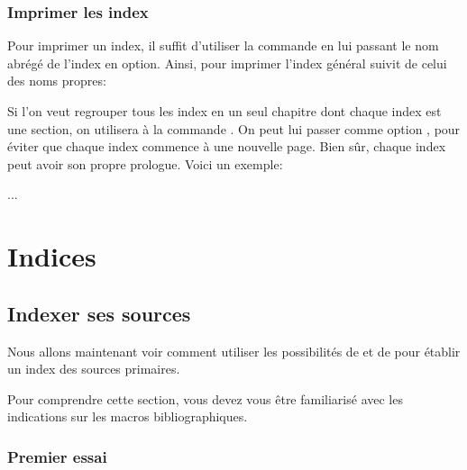 \subsection{Imprimer les index}

Pour imprimer un index, il suffit d'utiliser la commande  en lui passant le nom abrégé de l'index en option. Ainsi, pour imprimer l'index général suivit de celui des noms propres:

\begin{latexcode}
\printindex
\printindex[npr]
\end{latexcode}


\begin{plusloins}

Si l'on veut regrouper tous les index en un seul chapitre dont chaque index est une section, on utilisera  à la commande . On peut lui passer comme option , pour  éviter que chaque index commence à une nouvelle page. Bien sûr, chaque index peut avoir son propre prologue. Voici un exemple: 

\begin{latexcode}
... 
\chapter*{Indices}
\printindex

\printindex[aut] 
\end{latexcode}
\end{plusloins}

\section{Indexer ses sources}


Nous allons maintenant voir comment utiliser les possibilités de  et de  pour établir un index des sources primaires.

Pour comprendre cette section, vous devez vous être familiarisé avec les indications sur les macros bibliographiques.



\subsection{Premier essai}

